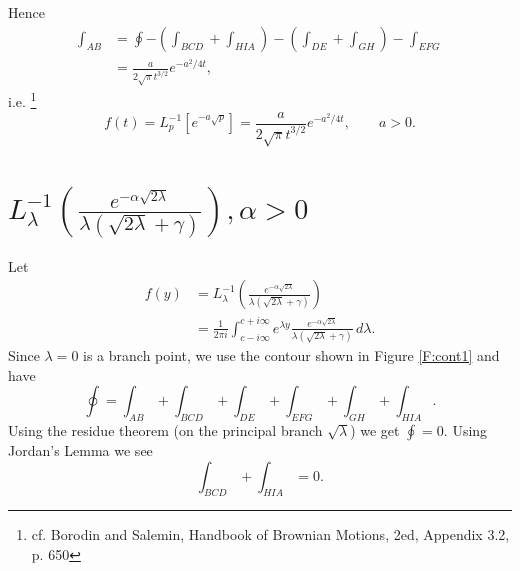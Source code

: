 Hence 
\begin{align*}
  \int_{AB} 
	&= \oint - \left( \int_{BCD} + \int_{HIA} \right)
     - \left( \int_{DE} + \int_{GH} \right) - \int_{EFG}  \\
  &= \frac{a}{2\sqrt{\pi} t^{3/2}} e^{-a^2/4t}, 
\end{align*}
i.e.
\footnote{cf. Borodin and Salemin, Handbook of Brownian Motions, 2ed, Appendix
3.2, p. 650}
\begin{equation} \label{E:ilt_1a}
	f(t)= L_p^{-1}\left[ e^{-a\sqrt{p}} \right]
      = \frac{a}{2\sqrt{\pi} t^{3/2}} e^{-a^2/4t}, \qquad a>0.
\end{equation}

\section{$ L_{\lambda}^{-1} 
\left( \frac{e^{-\alpha \sqrt{2\lambda}}}{\lambda(\sqrt{2\lambda}+\gamma)}
\right), \alpha > 0 $}
Let
\begin{align*}
  f(y) &= L_{\lambda}^{-1} 
          \left( 
            \frac{e^{-\alpha \sqrt{2\lambda}}}{\lambda(\sqrt{2\lambda}+\gamma)} 
          \right)    \\
       &= \frac{1}{2\pi i}   
           \int_{c-i\infty}^{c+i\infty} e^{\lambda y} 
           \frac{e^{-\alpha \sqrt{2\lambda}}}{\lambda(\sqrt{2\lambda}+\gamma)} 
           \, d\lambda.
\end{align*}
Since $\lambda=0$ is a branch point, we use the contour shown in Figure
\ref{F:cont1} and have
\[
  \oint = \int_{AB} + \int_{BCD} + \int_{DE} + \int_{EFG} + \int_{GH}
          + \int_{HIA}.
\]
Using the residue theorem (on the principal branch $\sqrt{\lambda}$) we get 
$\oint=0$. Using Jordan's Lemma we see
\[
  \int_{BCD} + \int_{HIA} = 0.
\]


